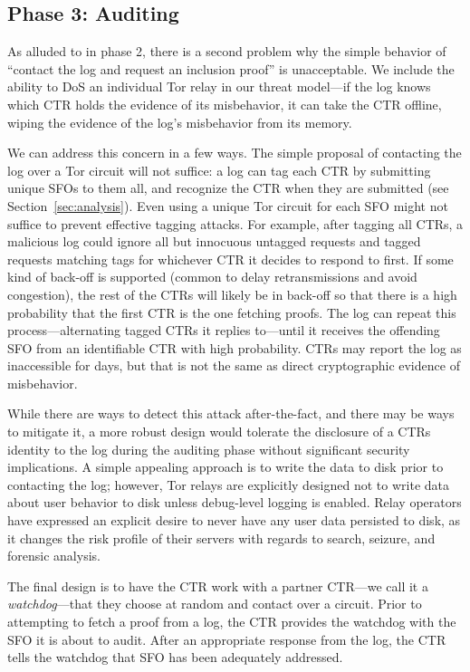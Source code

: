\subsection{Phase 3: Auditing} \label{sec:base:phase3}

As alluded to in phase 2, there is a second problem why the simple behavior of
``contact the log and request an inclusion proof'' is unacceptable. We include
the ability to DoS an individual Tor relay in our threat model---if the log
knows which CTR holds the evidence of its misbehavior, it can take the CTR
offline, wiping the evidence of the log's misbehavior from its memory. 

We can address this concern in a few ways. The simple proposal of contacting the
log over a Tor circuit will not suffice:
	a log can tag each CTR by submitting unique SFOs to them all, and
	recognize the CTR when they are submitted (see
	Section~\ref{sec:analysis}).
Even using a unique Tor circuit for each SFO might not suffice to prevent
effective tagging attacks. For example, after tagging all CTRs, a malicious log
could ignore all but innocuous untagged requests and tagged requests matching
tags for whichever CTR it decides to respond to first. If some kind of
back-off is supported (common to delay retransmissions and avoid congestion),
the rest of the CTRs will likely be in back-off so that there is a high
probability that the first CTR is the one fetching proofs.  The log can repeat
this process---alternating tagged CTRs it replies to---until it receives the
offending SFO from an identifiable CTR with high probability.  CTRs may report
the log as inaccessible for days, but that is not the same as direct
cryptographic evidence of misbehavior.

While there are ways to detect this attack after-the-fact, and there may be ways
to mitigate it, a more robust design would tolerate the disclosure of a CTRs
identity to the log during the auditing phase without significant security
implications.  A simple appealing approach is to write the data to disk prior
to contacting the log; however, Tor relays are explicitly designed not to write
data about user behavior to disk unless debug-level logging is enabled. Relay
operators have expressed an explicit desire to never have any user data
persisted to disk, as it changes the risk profile of their servers with regards
to search, seizure, and forensic analysis.

The final design is to have the CTR work with a partner CTR---we call it a
\emph{watchdog}---that they choose at random and contact over a circuit. Prior
to attempting to fetch a proof from a log, the CTR provides the watchdog with
the SFO it is about to audit. After an appropriate response from the log, the
CTR tells the watchdog that SFO has been adequately addressed.

